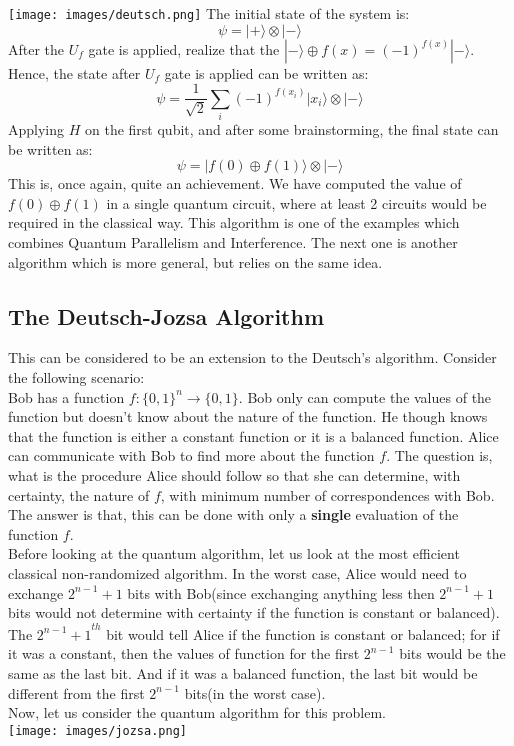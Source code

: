 \documentclass{article}
\begin{document}
\texttt{[image: images/deutsch.png]}
The initial state of the system is: $$\psi = |+ \rangle \otimes |- \rangle$$
After the $U_f$ gate is applied, realize that the $|- \rangle \oplus f(x) = (-1)^{f(x)}|- \rangle$. Hence, the state after $U_f$ gate is applied can be written as:
$$\psi = \frac{1}{\sqrt{2}}\sum_i (-1)^{f(x_i)}|x_i \rangle \otimes |- \rangle$$
Applying $H$ on the first qubit, and after some brainstorming, the final state can be written as:
$$\psi = |f(0) \oplus f(1) \rangle \otimes |- \rangle$$
This is, once again, quite an achievement. We have computed the value of $f(0) \oplus f(1)$ in a single quantum circuit, where at least 2 circuits would be required in the classical way. This algorithm is one of the examples which combines Quantum Parallelism and Interference. The next one is another algorithm which is more general, but relies on the same idea.

\cleardoublepage
\subsection{The Deutsch-Jozsa Algorithm}
This can be considered to be an extension to the Deutsch's algorithm. Consider the following scenario: \\[5pt]
Bob has a function $f:\{0, 1\}^n \longrightarrow \{0, 1\}$. Bob only can compute the values of the function but doesn't know about the nature of the function. He though knows that the function is either a constant function or it is a balanced function. Alice can communicate with Bob to find more about the function $f$. The question is, what is the procedure Alice should follow so that she can determine, with certainty, the nature of $f$, with minimum number of correspondences with Bob. The answer is that, this can be done with only a \textbf{single} evaluation of the function $f$. \\[3pt]
Before looking at the quantum algorithm, let us look at the most efficient classical non-randomized algorithm. In the worst case, Alice would need to exchange $2^{n-1} + 1$ bits with Bob(since exchanging anything less then $2^{n-1} + 1$ bits would not determine with certainty if the function is constant or balanced). The ${2^{n-1} + 1}^{th}$ bit would tell Alice if the function is constant or balanced; for if it was a constant, then the values of function for the first $2^{n-1}$ bits would be the same as the last bit. And if it was a balanced function, the last bit would be different from the first $2^{n-1}$ bits(in the worst case). \\[5pt]
Now, let us consider the quantum algorithm for this problem.\\[5pt]
\texttt{[image: images/jozsa.png]}
\end{document}
